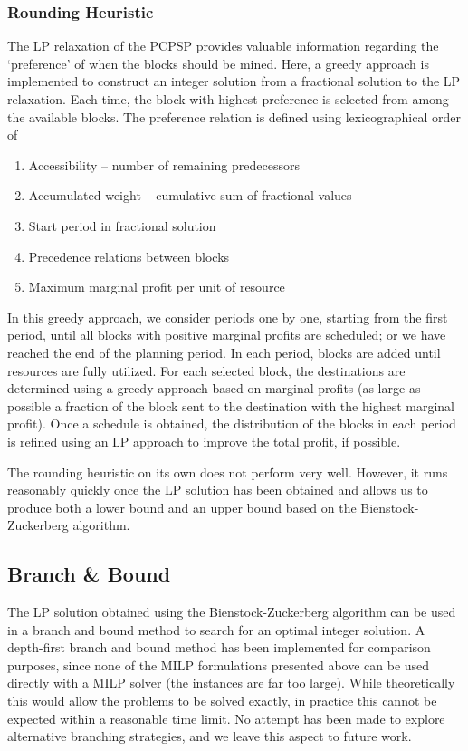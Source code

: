 \documentclass[authoryear,11pt,square,number,times,super,comma]{elsarticle}
\begin{document}
\subsubsection{Rounding Heuristic}\label{sec:round}
The LP relaxation of the PCPSP provides valuable information regarding the `preference' of when the blocks should be mined. Here, a greedy approach is implemented to construct an integer solution from a fractional solution to the LP relaxation. Each time, the block with highest preference is selected from among the available blocks. 
The preference relation is defined using lexicographical order of 
\begin{enumerate}
\item Accessibility -- number of remaining predecessors
\item Accumulated weight -- cumulative sum of fractional values
\item Start period in fractional solution
\item Precedence relations between blocks
\item Maximum marginal profit per unit of resource 
\end{enumerate}
In this greedy approach, we consider periods one by one, starting from the
first period, until all blocks with positive marginal profits are scheduled; or we have reached the end of the planning period. In each period, blocks are added until
resources are fully utilized. For each selected block, the destinations are
determined using a greedy approach based on marginal profits (as large as possible a fraction of the block sent to the destination with the highest marginal
profit). Once a schedule is obtained, the distribution of the blocks in each
period is refined using an LP approach to improve the total profit, if possible.

The rounding heuristic on its own does not perform very well. However, it runs reasonably quickly once the LP solution has been obtained and allows us to produce both a lower bound and an upper bound based on the Bienstock-Zuckerberg algorithm. 

\subsection{Branch \& Bound}\label{sec:BB}
The LP solution obtained using the Bienstock-Zuckerberg algorithm can be used
in a branch and bound method to search for an optimal integer solution. A
depth-first branch and bound method has been implemented for comparison
purposes, since none of the MILP formulations presented above can be used
directly with a MILP solver (the instances are far too large). While theoretically this would allow the problems to be solved exactly, in practice this cannot be expected within a reasonable time limit. No attempt has been made to explore alternative branching strategies, and we leave this aspect to future work.
\end{document}
